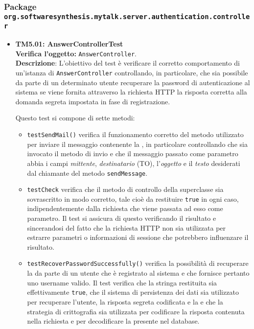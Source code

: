 \subsubsection{Package \texttt{org.softwaresynthesis.mytalk.server.authentication.controller}}
\begin{itemize}

\item[\passed] \textbf{TM5.01: AnswerControllerTest}\\
\textbf{Verifica l'oggetto:} \texttt{AnswerController}.\\
\textbf{Descrizione}: L'obiettivo del test è verificare il corretto comportamento di un'istanza di \texttt{AnswerController} controllando, in particolare, che sia possibile da parte di un determinato utente recuperare la password di autenticazione al sistema se viene fornita attraverso la richiesta HTTP la risposta corretta alla domanda segreta impostata in fase di registrazione.

Questo test si compone di sette metodi:
\begin{itemize}

\item \texttt{testSendMail()} verifica il funzionamento corretto del metodo utilizzato per inviare il messaggio contenente la , in particolare controllando che sia invocato il metodo di invio e che il messaggio passato come parametro abbia i campi \textit{mittente}, \textit{destinatario} (TO), l'\textit{oggetto} e il \textit{testo} desiderati dal chiamante del metodo \texttt{sendMessage}.

\item \texttt{testCheck} verifica che il metodo di controllo della superclasse sia sovrascritto in modo corretto, tale cioè da restituire \texttt{true} in ogni caso, indipendentemente dalla richiesta che viene passata ad esso come parametro. Il test si assicura di questo verificando il risultato e sincerandosi del fatto che la richiesta HTTP non sia utilizzata per estrarre parametri o informazioni di sessione che potrebbero influenzare il risultato.

\item \texttt{testRecoverPasswordSuccessfully()} verifica la possibilità di recuperare la  da parte di un utente che è registrato al sistema e che fornisce pertanto uno username valido. Il test verifica che la stringa restituita sia effettivamente \texttt{true}, che il sistema di persistenza dei dati sia utilizzato per recuperare l'utente, la risposta segreta codificata e la  e che la strategia di crittografia sia utilizzata per codificare la risposta contenuta nella richiesta e per decodificare la  presente nel database.


\end{itemize}
\end{itemize}
